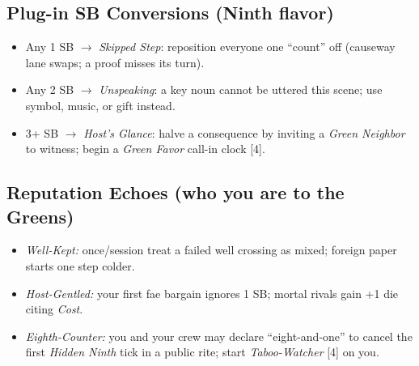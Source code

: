 \subsection*{Plug-in SB Conversions (Ninth flavor)}
\begin{itemize}
  \item Any 1 SB $\rightarrow$ \emph{Skipped Step}: reposition everyone one “count” off (causeway lane swaps; a proof misses its turn). 
  \item Any 2 SB $\rightarrow$ \emph{Unspeaking}: a key noun cannot be uttered this scene; use symbol, music, or gift instead. 
  \item 3+ SB $\rightarrow$ \emph{Host’s Glance}: halve a consequence by inviting a \emph{Green Neighbor} to witness; begin a \emph{Green Favor} call-in clock [4].
\end{itemize}

\subsection*{Reputation Echoes (who you are to the Greens)}
\begin{itemize}
  \item \emph{Well-Kept:} once/session treat a failed well crossing as mixed; foreign paper starts one step colder. 
  \item \emph{Host-Gentled:} your first fae bargain ignores 1 SB; mortal rivals gain +1 die citing \emph{Cost}. 
  \item \emph{Eighth-Counter:} you and your crew may declare “eight-and-one” to cancel the first \emph{Hidden Ninth} tick in a public rite; start \emph{Taboo-Watcher} [4] on you.
\end{itemize}